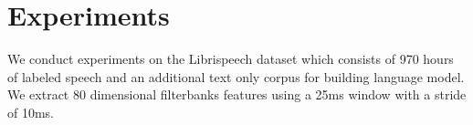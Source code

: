 \documentclass[a4paper]{article}
\newcommand{\netname}{ContextNet}
\begin{document}
\begin{table}[!tb]
    \centering
    \caption{Configuration of the \netname{} encoder. $\alpha$ controls the number of output channels, and thus the scaling of our model. The kernel size is for the window size in the temporal domain; the convolutions are across frequency. If the stride of a convolution block is 2, its last conv layer has a stride of two while the rest of the conv layers has a stride of one, as discussed in Section~\ref{sec:model:encoder}.}
    \label{tab:network_configuration}
\end{table}
 \vspace{-0.05in}
\section{Experiments}  
\vspace{-0.02in}
\label{sec:exp}

We conduct experiments on the Librispeech \cite{panayotov2015librispeech} dataset which consists of 970 hours of labeled speech and an additional text only corpus for building language model. We extract 80 dimensional filterbanks features using a 25ms window with a stride of 10ms.
\end{document}
